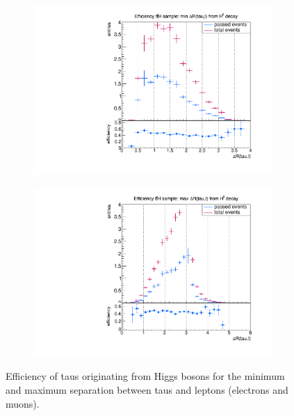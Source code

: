 %
\begin{figure}
  \centering
                \begin{subfigure}[t]{0.49\textwidth}
                \includegraphics[width=\textwidth]{figures/plots/ttH/Divided_fromH_mindR_taulepton.pdf}
                \label{dR:fromH:taulepton:min}
                \end{subfigure}
                \begin{subfigure}[t]{0.49\textwidth}
                \includegraphics[width=\textwidth]{figures/plots/ttH/Divided_maxdR_fromH_taulepton.pdf}
                \label{dR:fromH:taulepton:max}
                \end{subfigure}
\caption[Efficiency of taus originating from Higgs bosons for the separation between taus and leptons.]{Efficiency of taus originating from Higgs bosons for the minimum and maximum separation between taus and leptons (electrons and muons).}
\label{dR:fromH:taulepton}
\end{figure}
